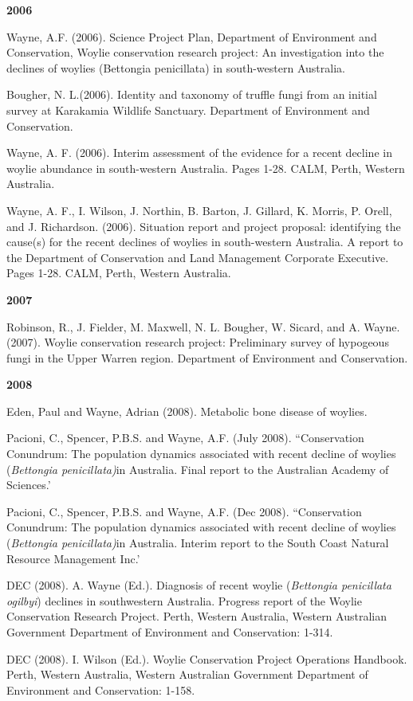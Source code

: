 \documentclass[version=last,
    paper=a4,                               %
    10pt,                                   %
    dvipsnames,
    oneside,                              %
    headings=openany,                       %
    open=any,
    BCOR=7mm,                               %
    DIV=15,     %
]{scrbook}
\begin{document}
\textbf{2006}

Wayne, A.F. (2006). Science Project Plan, Department of Environment and
Conservation, Woylie conservation research project: An investigation
into the declines of woylies (Bettongia penicillata) in south-western
Australia.

Bougher, N. L.(2006). Identity and taxonomy of truffle fungi from an
initial survey at Karakamia Wildlife Sanctuary. Department of
Environment and Conservation.

Wayne, A. F. (2006). Interim assessment of the evidence for a recent
decline in woylie abundance in south-western Australia. Pages 1-28.
CALM, Perth, Western Australia.

Wayne, A. F., I. Wilson, J. Northin, B. Barton, J. Gillard, K. Morris,
P. Orell, and J. Richardson. (2006). Situation report and project
proposal: identifying the cause(s) for the recent declines of woylies in
south-western Australia. A report to the Department of Conservation and
Land Management Corporate Executive. Pages 1-28. CALM, Perth, Western
Australia.

\textbf{2007}

Robinson, R., J. Fielder, M. Maxwell, N. L. Bougher, W. Sicard, and A.
Wayne. (2007). Woylie conservation research project: Preliminary survey
of hypogeous fungi in the Upper Warren region. Department of Environment
and Conservation.

\textbf{2008}

Eden, Paul and Wayne, Adrian (2008). Metabolic bone disease of woylies.

Pacioni, C., Spencer, P.B.S. and Wayne, A.F. (July 2008). ``Conservation
Conundrum: The population dynamics associated with recent decline of
woylies (\emph{Bettongia penicillata)}in Australia. Final report to the
Australian Academy of Sciences.'

Pacioni, C., Spencer, P.B.S. and Wayne, A.F. (Dec 2008). ``Conservation
Conundrum: The population dynamics associated with recent decline of
woylies (\emph{Bettongia penicillata)}in Australia. Interim report to
the South Coast Natural Resource Management Inc.'

DEC (2008). A. Wayne (Ed.). Diagnosis of recent woylie (\emph{Bettongia
penicillata ogilbyi}) declines in southwestern Australia. Progress
report of the Woylie Conservation Research Project. Perth, Western
Australia, Western Australian Government Department of Environment and
Conservation: 1-314.

DEC (2008). I. Wilson (Ed.). Woylie Conservation Project Operations
Handbook. Perth, Western Australia, Western Australian Government
Department of Environment and Conservation: 1-158.
\end{document}
